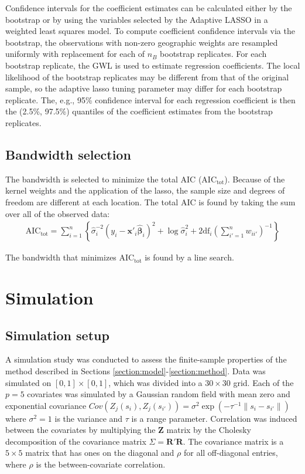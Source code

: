 \documentclass[authoryear, review, 11pt]{elsarticle}
\begin{document}
	 Confidence intervals for the coefficient estimates can be calculated either by the bootstrap \citep{Efron:1986} or by using the variables selected by the Adaptive LASSO in a weighted least squares model. To compute coefficient confidence intervals via the bootstrap, the observations with non-zero geographic weights are resampled uniformly with replacement for each of $n_B$ bootstrap replicates. For each bootstrap replicate, the GWL is used to estimate regression coefficients. The local likelihood of the bootstrap replicates may be different from that of the original sample, so the adaptive lasso tuning parameter may differ for each bootstrap replicate. The, e.g., 95\% confidence interval for each regression coefficient is then the (2.5\%, 97.5\%) quantiles of the coefficient estimates from the bootstrap replicates. \\

	\subsection{Bandwidth selection}
		The bandwidth is selected to minimize the total AIC ($\mbox{AIC}_{\mbox{tot}}$). Because of the kernel weights and the application of the lasso, the sample size and degrees of freedom are different at each location. The total AIC is found by taking the sum over all of the observed data:		
		\begin{eqnarray}
			\mbox{AIC}_{\mbox{tot}} = \sum_{i=1}^n \left\{ \hat{\sigma}_i^{-2} \left( y_i - \bm{x}'_i \hat{\bm{\beta}}_i \right)^2 + \log \hat{\sigma}_i^2 + 2 \mbox{df}_i \left(\sum_{i'=1}^n w_{ii'} \right)^{-1} \right\}
		\end{eqnarray}
			
			The bandwidth that minimizes $\mbox{AIC}_{\mbox{tot}}$ is found by a line search.\\
			
\section{Simulation}
	\subsection{Simulation setup}
		A simulation study was conducted to assess the finite-sample properties of the method described in Sections \ref{section:model}-\ref{section:method}. Data was simulated on $[0,1] \times [0,1]$, which was divided into a $30 \times 30$ grid. Each of the $p=5$ covariates was simulated by a Gaussian random field with mean zero and exponential covariance $Cov \left(Z_j(s_i), Z_j(s_{i'}) \right) = \sigma^2 \exp{\left( -\tau^{-1} \|s_i - s_{i'} \| \right)}$ where $\sigma^2=1$ is the variance and $\tau$ is a range parameter. Correlation was induced between the covariates by multiplying the $\bm{Z}$ matrix by the Cholesky decomposition of the covariance matrix $\Sigma = \bm{R}'\bm{R}$. The covariance matrix is a $5 \times 5$ matrix that has ones on the diagonal and $\rho$ for all off-diagonal entries, where $\rho$ is the between-covariate correlation.\\
		
\end{document}
